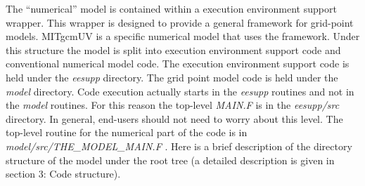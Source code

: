 The ``numerical'' model is contained within a execution environment support
wrapper. This wrapper is designed to provide a general framework for
grid-point models. MITgcmUV is a specific numerical model that uses the
framework. Under this structure the model is split into execution
environment support code and conventional numerical model code. The
execution environment support code is held under the \textit{eesupp}
directory. The grid point model code is held under the \textit{model}
directory. Code execution actually starts in the \textit{eesupp} routines
and not in the \textit{model} routines. For this reason the top-level 
\textit{MAIN.F} is in the \textit{eesupp/src} directory. In general,
end-users should not need to worry about this level. The top-level routine
for the numerical part of the code is in \textit{model/src/THE\_MODEL\_MAIN.F%
}. Here is a brief description of the directory structure of the model under
the root tree (a detailed description is given in section 3: Code structure).


